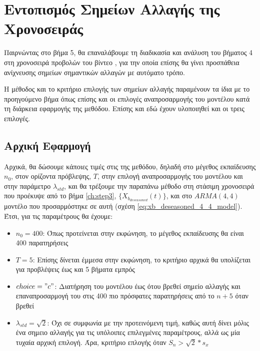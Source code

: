 \chapter{Εντοπισμός Σημείων Αλλαγής της Χρονοσειράς }
\label{ch:step5}
\thispagestyle{fancy}

Παιρνώντας στο βήμα 5, θα επαναλάβουμε τη διαδικασία και ανάλυση του βήματος 4 στη χρονοσειρά προβολών του βίντεο , για την οποία επίσης θα γίνει προσπάθεια ανίχνευσης σημείων σημαντικών αλλαγών με αυτόματο τρόπο.

\par Η μέθοδος και το κριτήριο επιλογής των σημείων αλλαγής παραμένουν τα ίδια με το προηγούμενο βήμα όπως επίσης και οι επιλογές αναπροσαρμογής του μοντέλου κατά τη διάρκεια εφαρμογής της μεθόδου. Επίσης και εδώ έχουν υλοποιηθεί και οι τρεις επιλογές.

\section{Αρχική Εφαρμογή}

Αρχικά, θα δώσουμε κάποιες τιμές στις  της μεθόδου, δηλαδή στο μέγεθος εκπαίδευσης $n_0$, στον ορίζοντα πρόβλεψης, $T$, στην επιλογή αναπροσαρμογής του μοντέλου και στην παράμετρο $\lambda_{std}$, και θα τρέξουμε την παραπάνω μέθοδο στη στάσιμη χρονοσειρά που προέκυψε από το βήμα \ref{ch:step3}, $\{X_{b_{deseasoned}}(t)\}$, και στο $ARMA(4,4)$ μοντέλο που προσαρμόστηκε σε αυτή (σχέση \ref{eq:xb_deseasoned_4_4_model}). Έτσι, για τις παραμέτρους θα έχουμε:
\renewcommand{\labelitemi}{\textendash}
\begin{itemize}
    \item $n_0=400$: Όπως προτείνεται στην εκφώνηση, το μέγεθος εκπαίδευσης θα είναι 400 παρατηρήσεις
    \item $T=5$: Επίσης δίνεται έμμεσα στην εκφώνηση, το κριτήριο αρχικά θα υπολίζεται για προβλέψεις έως και 5 βήματα εμπρός
    \item $choice="c"$: Διατήρηση του μοντέλου έως ότου βρεθεί σημείο αλλαγής και επαναπροσαρμογή του στις 400 πιο πρόσφατες παρατηρήσεις από το $n+5$ όταν βρεθεί
    \item $\lambda_{std}=\sqrt{2}$: Όχι σε συμφωνία με την προτεινόμενη τιμή, καθώς αυτή δίνει μόλις ένα σημειο αλλαγής για τις υπόλοιπες επιλεγμένες παραμέτρους, αλλά ως μία τυχαία αρχική επιλογή. Άρα, κριτήριο επλογής  όταν $S_n > \sqrt{2} * s_x$
\end{itemize}


